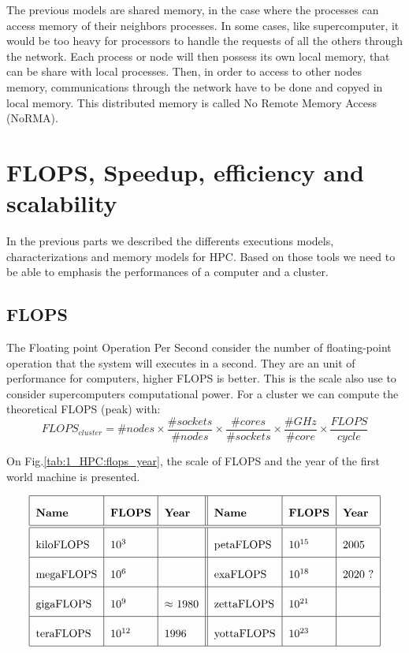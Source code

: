 The previous models are shared memory, in the case where the processes can access memory of their neighbors processes. 
In some cases, like supercomputer, it would be too heavy for processors to handle the requests of all the others through the network. 
Each process or node will then possess its own local memory, that can be share with local processes. 
Then, in order to access to other nodes memory, communications through the network have to be done and copyed in local memory. 
This distributed memory is called No Remote Memory Access (NoRMA).

\section{FLOPS, Speedup, efficiency and scalability}
In the previous parts we described the differents executions models, characterizations and memory models for HPC. 
Based on those tools we need to be able to emphasis the performances of a computer and a cluster. 

\subsection{FLOPS}
The Floating point Operation Per Second consider the number of floating-point operation that the system will executes in a second. 
They are an unit of performance for computers, higher FLOPS is better. 
This is the scale also use to consider supercomputers computational power. 
For a cluster we can compute the theoretical FLOPS (peak) with:
\begin{equation}
FLOPS_{cluster} = \#nodes \times \frac{\#sockets}{\#nodes} \times \frac{\#cores}{\#sockets} \times \frac{\#GHz}{\#core} \times \frac{FLOPS}{cycle}
\end{equation}

On Fig.\ref{tab:1_HPC:flops_year}, the scale of FLOPS and the year of the first world machine is presented. 

\begin{table}
\[\arraycolsep=1.4pt\def\arraystretch{2.2}
\begin{tabular}{| l | l | l || l | l | l |}
	\hline
	\textbf{Name} & \textbf{FLOPS} & \textbf{Year} & \textbf{Name} & \textbf{FLOPS} & \textbf{Year} \\
	\hline
	\hline
	kiloFLOPS & $10^{3}$ & & petaFLOPS  & $10^{15}$ & 2005 \\ 
	\hline
	megaFLOPS & $10^{6}$ & & exaFLOPS   & $10^{18}$ & 2020 ? \\
	\hline
	gigaFLOPS & $10^{9}$ & $\approx$ 1980  & zettaFLOPS & $10^{21}$ & \\
	\hline
	teraFLOPS & $10^{12}$ & 1996 & yottaFLOPS & $10^{23}$ & \\
	\hline
\end{tabular}
\]
\caption{Floating-point Operation per Second and years in HPC.}
\label{tab:1_HPC:flops_year}
\end{table}

